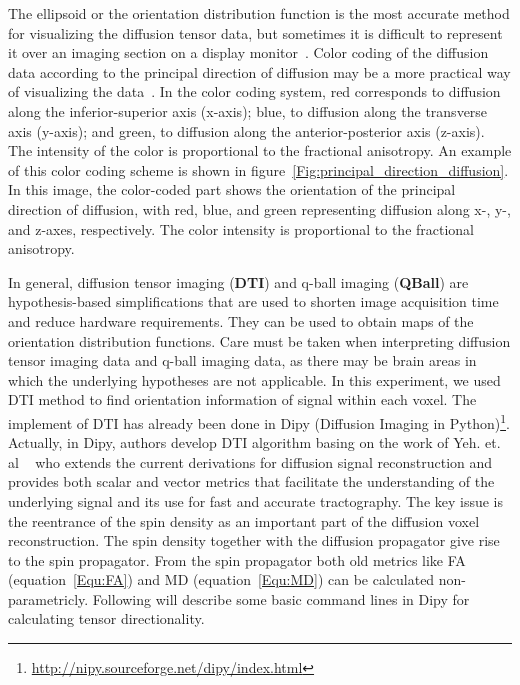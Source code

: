 The ellipsoid or the orientation distribution function is the most accurate method for visualizing the diffusion tensor data, but sometimes it is difficult to represent it over an imaging section on a display monitor~\cite{basser1994diffusion}. Color coding of the diffusion data according to the principal direction of diffusion may be a more practical way of visualizing the data~\cite{bihan2001tensor}. In the color coding system, red corresponds to diffusion along the inferior-superior axis (x-axis); blue, to diffusion along the transverse axis (y-axis); and green, to diffusion along the anterior-posterior axis (z-axis). The intensity of the color is proportional to the fractional anisotropy. An example of this color coding scheme is shown in figure~\ref{Fig:principal_direction_diffusion}. In this image, the color-coded part shows the orientation of the principal direction of diffusion, with red, blue, and green representing diffusion along x-, y-, and z-axes, respectively. The color intensity is proportional to the fractional anisotropy.

In general, diffusion tensor imaging (\textbf{DTI}) and q-ball imaging (\textbf{QBall}) are hypothesis-based simplifications that are used to shorten image acquisition time and reduce hardware requirements. They can be used to obtain maps of the orientation distribution functions. Care must be taken when interpreting diffusion tensor imaging data and q-ball imaging data, as there may be brain areas in which the underlying hypotheses are not applicable. In this experiment, we used DTI method to find orientation information of signal within each voxel. The implement of DTI has already been done in Dipy (Diffusion Imaging in Python)\footnote{\url{http://nipy.sourceforge.net/dipy/index.html}}. Actually, in Dipy, authors develop DTI algorithm basing on the work of Yeh. et. al ~\cite{yeh2010qsampling} who extends the current derivations for diffusion signal reconstruction and provides both scalar and vector metrics that facilitate the understanding of the underlying signal and its use for fast and accurate tractography. The key issue is the reentrance of the spin density as an important part of the diffusion voxel reconstruction. The spin density together with the diffusion propagator give rise to the spin propagator. From the spin propagator both old metrics like FA (equation~\ref{Equ:FA}) and MD (equation~\ref{Equ:MD}) can be calculated non-parametricly. Following will describe some basic command lines in Dipy for calculating tensor directionality.


